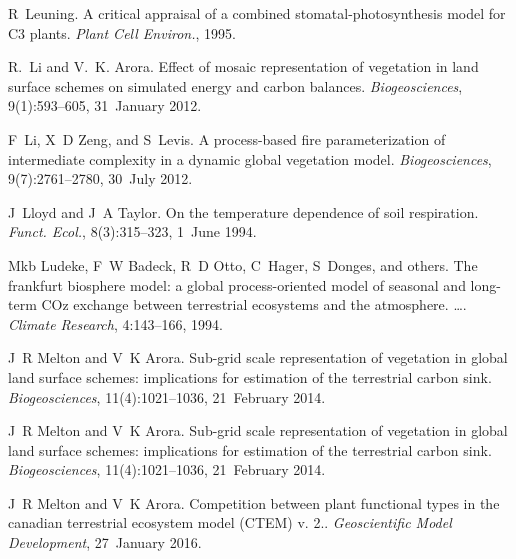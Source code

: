 \begin{DoxyDescription}
\item[\label{_CITEREF_Leuning1995-ab}%
\mbox{[}32\mbox{]}]R~Leuning. A critical appraisal of a combined stomatal-\/photosynthesis model for C3 plants. {\itshape Plant Cell Environ.}, 1995.


\item[\label{_CITEREF_Li2012-f7f}%
\mbox{[}33\mbox{]}]R.~Li and V.~K. Arora. Effect of mosaic representation of vegetation in land surface schemes on simulated energy and carbon balances. {\itshape Biogeosciences}, 9(1)\+:593--605, 31~January 2012. 


\item[\label{_CITEREF_Li20121c2}%
\mbox{[}34\mbox{]}]F~Li, X~D Zeng, and S~Levis. A process-\/based fire parameterization of intermediate complexity in a dynamic global vegetation model. {\itshape Biogeosciences}, 9(7)\+:2761--2780, 30~July 2012. 


\item[\label{_CITEREF_Lloyd1994-ct}%
\mbox{[}35\mbox{]}]J~Lloyd and J~A Taylor. On the temperature dependence of soil respiration. {\itshape Funct. Ecol.}, 8(3)\+:315--323, 1~June 1994. 


\item[\label{_CITEREF_Ludeke1994-px}%
\mbox{[}36\mbox{]}]Mkb Ludeke, F~W Badeck, R~D Otto, C~Hager, S~Donges, and others. The frankfurt biosphere model\+: a global process-\/oriented model of seasonal and long-\/term C\+Oz exchange between terrestrial ecosystems and the atmosphere. …. {\itshape Climate Research}, 4\+:143--166, 1994.


\item[\label{_CITEREF_Melton2014-xk}%
\mbox{[}37\mbox{]}]J~R Melton and V~K Arora. Sub-\/grid scale representation of vegetation in global land surface schemes\+: implications for estimation of the terrestrial carbon sink. {\itshape Biogeosciences}, 11(4)\+:1021--1036, 21~February 2014. 


\item[\label{_CITEREF_Melton2014-xy}%
\mbox{[}38\mbox{]}]J~R Melton and V~K Arora. Sub-\/grid scale representation of vegetation in global land surface schemes\+: implications for estimation of the terrestrial carbon sink. {\itshape Biogeosciences}, 11(4)\+:1021--1036, 21~February 2014. 


\item[\label{_CITEREF_Melton2016-zx}%
\mbox{[}39\mbox{]}]J~R Melton and V~K Arora. Competition between plant functional types in the canadian terrestrial ecosystem model (C\+T\+E\+M) v. 2.. {\itshape Geoscientific Model Development}, 27~January 2016. 



\end{DoxyDescription}
